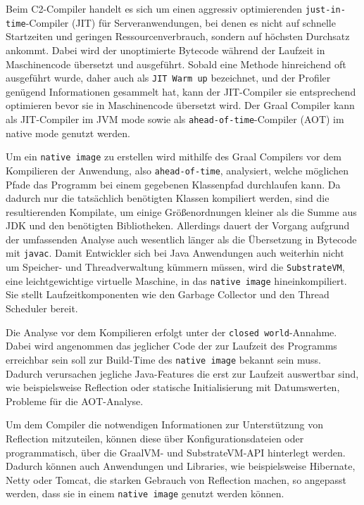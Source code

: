 Beim C2-Compiler handelt es sich um einen aggressiv optimierenden \verb|just-in-time|-Compiler (JIT) für Serveranwendungen, bei denen es nicht auf
schnelle Startzeiten und geringen Ressourcenverbrauch, sondern auf höchsten Durchsatz ankommt.
Dabei wird der unoptimierte Bytecode während der Laufzeit in Maschinencode übersetzt und ausgeführt. Sobald eine Methode hinreichend oft
ausgeführt wurde, daher auch als \verb|JIT Warm up| bezeichnet, und der Profiler genügend Informationen gesammelt hat, kann der JIT-Compiler
sie entsprechend optimieren bevor sie in Maschinencode übersetzt wird.
Der Graal Compiler kann als JIT-Compiler im JVM mode sowie als \verb|ahead-of-time|-Compiler (AOT) im native mode genutzt werden.\newline

Um ein \verb|native image| zu erstellen wird mithilfe des Graal Compilers vor dem Kompilieren der Anwendung, also \verb|ahead-of-time|,
analysiert, welche möglichen Pfade das Programm bei einem gegebenen Klassenpfad durchlaufen kann. Da dadurch nur die tatsächlich benötigten Klassen
kompiliert werden, sind die resultierenden Kompilate, um einige Größenordnungen kleiner als die Summe aus JDK und den benötigten Bibliotheken.
Allerdings dauert der Vorgang aufgrund der umfassenden Analyse auch wesentlich länger als die Übersetzung in Bytecode mit \verb|javac|.
Damit Entwickler sich bei Java Anwendungen auch weiterhin nicht um Speicher- und Threadverwaltung kümmern müssen, wird die \verb|SubstrateVM|, eine
leichtgewichtige virtuelle Maschine, in das \verb|native image| hineinkompiliert.
Sie stellt Laufzeitkomponenten wie den Garbage Collector und den Thread Scheduler bereit.

Die Analyse vor dem Kompilieren erfolgt unter der \verb|closed world|-Annahme. Dabei wird angenommen das jeglicher Code der zur Laufzeit des Programms
erreichbar sein soll zur Build-Time des \verb|native image| bekannt sein muss. Dadurch verursachen jegliche Java-Features die erst zur Laufzeit
auswertbar sind, wie beispielsweise Reflection oder statische Initialisierung mit Datumswerten, Probleme für die AOT-Analyse.

Um dem Compiler die notwendigen Informationen zur Unterstützung von Reflection mitzuteilen, können
diese über Konfigurationsdateien oder programmatisch, über die GraalVM- und SubstrateVM-API hinterlegt werden.
Dadurch können auch Anwendungen und Libraries, wie beispielsweise Hibernate, Netty oder Tomcat,
die starken Gebrauch von Reflection machen, so angepasst werden, dass sie in einem \verb|native image| genutzt werden können.
\parencite{GraalVMNativeImage}

